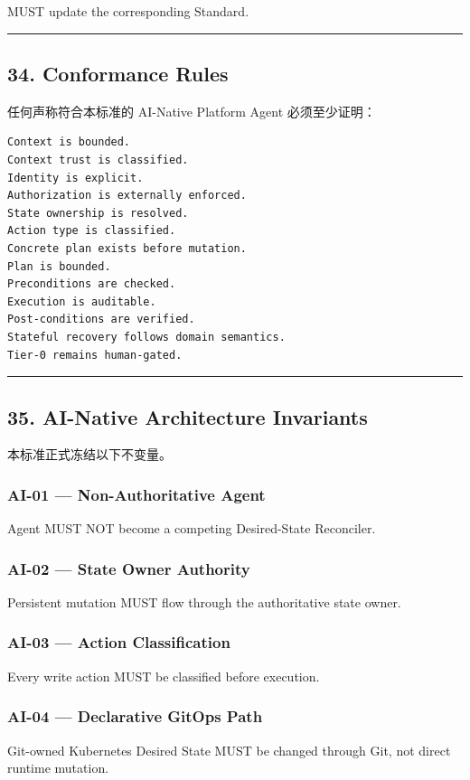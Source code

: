 \documentclass[11pt,a4paper]{article}
\begin{document}
\begin{gfmBlockquote}
MUST update the corresponding Standard.
\end{gfmBlockquote}
\vspace{0.5em}\hrule\vspace{0.5em}
\subsection{34. Conformance Rules}
任何声称符合本标准的 AI-Native Platform Agent 必须至少证明：

\begin{lstlisting}[language=text]
Context is bounded.
Context trust is classified.
Identity is explicit.
Authorization is externally enforced.
State ownership is resolved.
Action type is classified.
Concrete plan exists before mutation.
Plan is bounded.
Preconditions are checked.
Execution is auditable.
Post-conditions are verified.
Stateful recovery follows domain semantics.
Tier-0 remains human-gated.
\end{lstlisting}
\vspace{0.5em}\hrule\vspace{0.5em}
\subsection{35. AI-Native Architecture Invariants}
本标准正式冻结以下不变量。

\subsubsection{AI-01 — Non-Authoritative Agent}
Agent MUST NOT become a competing Desired-State Reconciler.

\subsubsection{AI-02 — State Owner Authority}
Persistent mutation MUST flow through the authoritative state owner.

\subsubsection{AI-03 — Action Classification}
Every write action MUST be classified before execution.

\subsubsection{AI-04 — Declarative GitOps Path}
Git-owned Kubernetes Desired State MUST be changed through Git, not direct runtime mutation.
\end{document}
